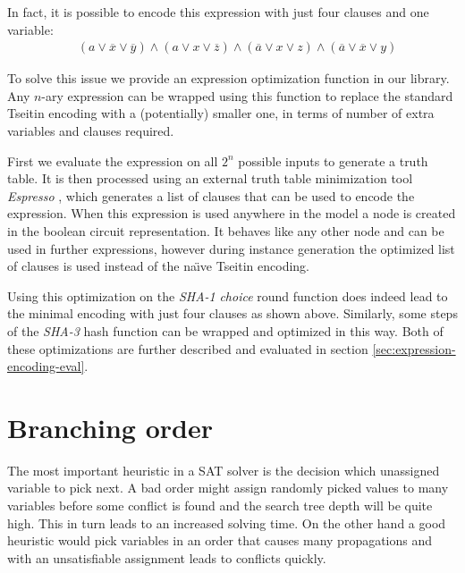In fact, it is possible to encode this expression with just four clauses and one variable:
\begin{align*}
&(a \lor \overline{x} \lor \overline{y}) \land (a \lor x \lor \overline{z}) \land (\overline{a} \lor x \lor z) \land (\overline{a} \lor \overline{x} \lor y)
\end{align*}


To solve this issue we provide an expression optimization function in our library.
Any $n$-ary expression can be wrapped using this function to replace the standard Tseitin encoding with a (potentially) smaller one, in terms of number of extra variables and clauses required.

First we evaluate the expression on all $2^n$ possible inputs to generate a truth table.
It is then processed using an external truth table minimization tool \emph{Espresso} \cite{rudell1986multiple}, which generates a list of clauses that can be used to encode the expression.
When this expression is used anywhere in the model a node is created in the boolean circuit representation.
It behaves like any other node and can be used in further expressions, however during instance generation the optimized list of clauses is used instead of the na\"{\i}ve Tseitin encoding.

Using this optimization on the \emph{SHA-1} \emph{choice} round function does indeed lead to the minimal encoding with just four clauses as shown above.
Similarly, some steps of the \emph{SHA-3} hash function can be wrapped and optimized in this way.
Both of these optimizations are further described and evaluated in section \ref{sec:expression-encoding-eval}.

\section{Branching order}
\label{sec:branching-order}

The most important heuristic in a SAT solver is the decision which unassigned variable to pick next.
A bad order might assign randomly picked values to many variables before some conflict is found and the search tree depth will be quite high.
This in turn leads to an increased solving time.
On the other hand a good heuristic would pick variables in an order that causes many propagations and with an unsatisfiable assignment leads to conflicts quickly.

